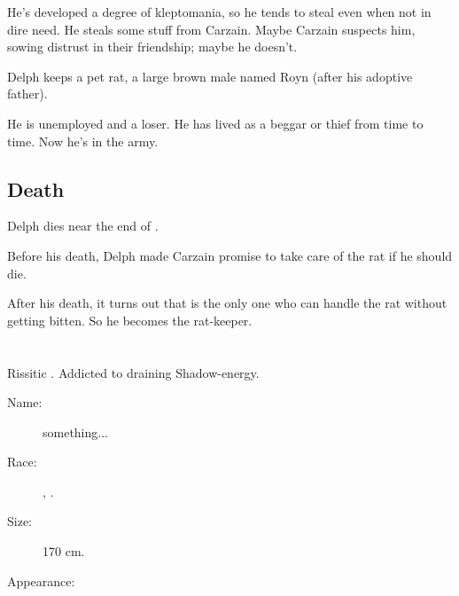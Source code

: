 He's developed a degree of kleptomania, so he tends to steal even when not in dire need. He steals some stuff from Carzain. Maybe Carzain suspects him, sowing distrust in their friendship; maybe he doesn't. 

Delph keeps a pet rat, a large brown male named Royn (after his adoptive father). 

He is unemployed and a loser. 
He has lived as a beggar or thief from time to time. 
Now he's in the army. 







\subsection{Death}
Delph dies near the end of \emph{\TwilightAngelRemember{}}. 

Before his death, Delph made Carzain promise to take care of the rat if he should die. 

After his death, it turns out that  is the only one who can handle the rat without getting bitten. So he becomes the rat-keeper. 















\section{\Dzerezdin}
Rissitic \Ashenoch{}. Addicted to draining Shadow-energy. 

\begin{description}
  \item[Name:] \Dzerezdin{} something... 
  \item[Race:] \Human, \Ashenoch{}. 
  \item[Size:] 170 cm. 
  \item[Appearance:] 
\end{description}
















